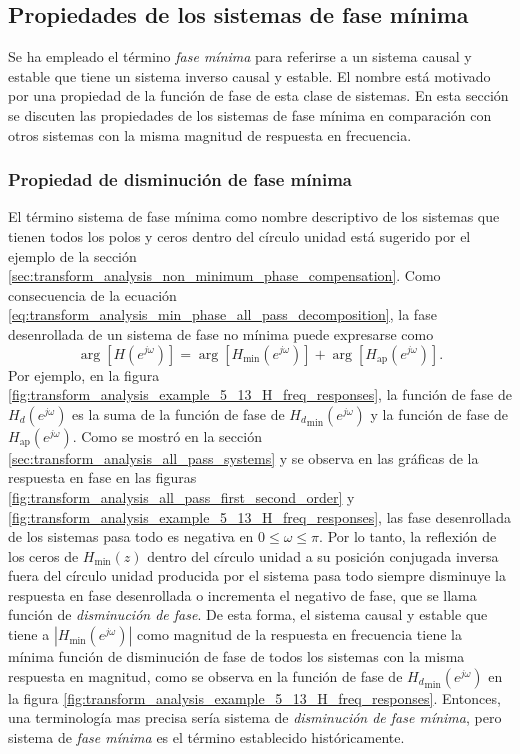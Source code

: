 \documentclass[a4paper]{report}
\begin{document}
\subsection{Propiedades de los sistemas de fase mínima}

Se ha empleado el término \emph{fase mínima} para referirse a un sistema causal y estable que tiene un sistema inverso causal y estable. El nombre está motivado por una propiedad de la función de fase de esta clase de sistemas. En esta sección se discuten las propiedades de los sistemas de fase mínima en comparación con otros sistemas con la misma magnitud de respuesta en frecuencia.

\subsubsection{Propiedad de disminución de fase mínima}

El término sistema de fase mínima como nombre descriptivo de los sistemas que tienen todos los polos y ceros dentro del círculo unidad está sugerido por el ejemplo de la sección \ref{sec:transform_analysis_non_minimum_phase_compensation}. Como consecuencia de la ecuación \ref{eq:transform_analysis_min_phase_all_pass_decomposition}, la fase desenrollada de un sistema de fase no mínima puede expresarse como
\[
 \arg[H(e^{j\omega})]=\arg[H_\textrm{min}(e^{j\omega})]+\arg[H_\textrm{ap}(e^{j\omega})].
\]
Por ejemplo, en la figura \ref{fig:transform_analysis_example_5_13_H_freq_responses}, la función de fase de \(H_d(e^{j\omega})\) es la suma de la función de fase de \({H_d}_\textrm{min}(e^{j\omega})\) y la función de fase de \(H_\textrm{ap}(e^{j\omega})\). Como se mostró en la sección \ref{sec:transform_analysis_all_pass_systems} y se observa en las gráficas de la respuesta en fase en las figuras \ref{fig:transform_analysis_all_pass_first_second_order} y \ref{fig:transform_analysis_example_5_13_H_freq_responses}, las fase desenrollada de los sistemas pasa todo es negativa en \(0\leq\omega\leq\pi\). Por lo tanto, la reflexión de los ceros de \(H_\textrm{min}(z)\) dentro del círculo unidad a su posición conjugada inversa fuera del círculo unidad producida por el sistema pasa todo siempre disminuye la respuesta en fase desenrollada o incrementa el negativo de fase, que se llama función de \emph{disminución de fase}. De esta forma, el sistema causal y estable que tiene a \(|H_\textrm{min}(e^{j\omega})|\) como magnitud de la respuesta en frecuencia tiene la mínima función de disminución de fase de todos los sistemas con la misma respuesta en magnitud, como se observa en la función de fase de \({H_d}_\textrm{min}(e^{j\omega})\) en la figura \ref{fig:transform_analysis_example_5_13_H_freq_responses}. Entonces, una terminología mas precisa sería sistema de \emph{disminución de fase mínima}, pero sistema de \emph{fase mínima} es el término establecido históricamente.
\end{document}
